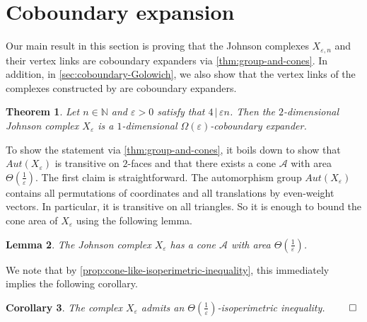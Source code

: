 \documentclass[10pt,a4paper]{article}
\newcommand{\prettyref}[1]{\cref{#1}}
\newtheorem{theorem}{Theorem}[section]
\newtheorem{lemma}[theorem]{Lemma}
\newtheorem{corollary}[theorem]{Corollary}
\theoremstyle{definition}
\theoremstyle{remark}
\newcommand{\Authornotecolored}[3]{{\sffamily\small\color{#1}{[#2: #3]}}}
\newcommand{\Authornotecolored}[3]{}
\newcommand{\Ynote}{\Authornotecolored{Purple}{Y}}
\numberwithin{equation}{section}
\let\pref=\prettyref
\begin{document}
\section{Coboundary expansion} \label{sec:cob-exp-johnson}
Our main result in this section is proving that the Johnson complexes $X_{\varepsilon,n}$ and their vertex links are \Ynote{make sure we say just cob-exp} coboundary expanders via  \pref{thm:group-and-cones}. In addition, in \pref{sec:coboundary-Golowich}, we also show that the vertex links of the complexes constructed by \cite{Golowich2023} are coboundary expanders.
\begin{theorem}\label{thm:coboundary-Johnson-complex}
    Let $n\in \mathbb{N}$ and $\varepsilon>0$ satisfy that $4\, |\, \varepsilon n$. Then the $2$-dimensional Johnson complex $X_{\varepsilon}$ is a $1$-dimensional $\Omega(\varepsilon)$-coboundary expander.
    
\end{theorem}
To show the statement via \pref{thm:group-and-cones}, it boils down to show that $Aut(X_{\varepsilon})$ is transitive on $2$-faces and that there exists a cone $\mathcal{A}$ with area $\Theta(\frac{1}{\varepsilon})$.
The first claim is straightforward. The automorphism group $Aut(X_{\varepsilon})$ contains all permutations of coordinates and all translations by even-weight vectors. In particular, it is transitive on all triangles. So it is enough to bound the cone area of $X_\varepsilon$ using the following lemma. 
\begin{lemma} \label{lem:cone-for-X}
      The Johnson complex \(X_\varepsilon\) has a cone $\mathcal{A}$ with area \(\Theta(\frac{1}{\varepsilon})\).
\end{lemma}
We note that by \pref{prop:cone-like-isoperimetric-inequality}, this immediately implies the following corollary.
\begin{corollary} \label{cor:isoperimetric-inequality}
    The complex \(X_\varepsilon\) admits an \(\Theta(\frac{1}{\varepsilon})\)-isoperimetric inequality. \(\qed\)
\end{corollary}
\end{document}
